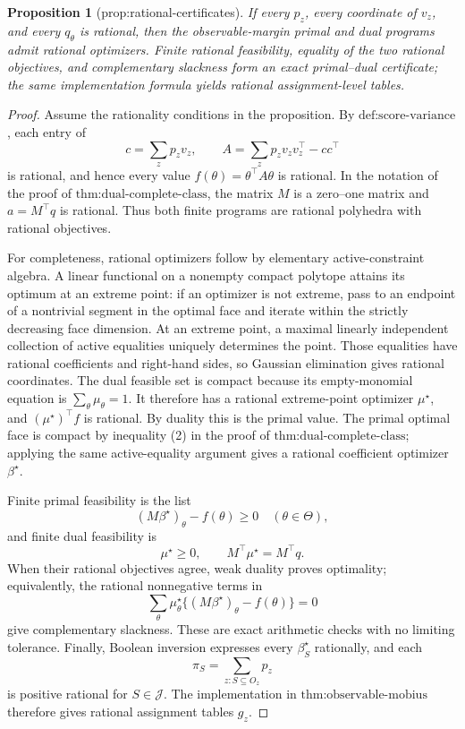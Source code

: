 \documentclass{article}
\newtheorem{proposition}{Proposition}
\begin{document}
\begin{proposition}[prop:rational-certificates]\label{prop:rational-certificates}
If every \(p_z\), every coordinate of \(v_z\), and every \(q_\theta\) is rational, then the observable-margin primal and dual programs admit rational optimizers. Finite rational feasibility, equality of the two rational objectives, and complementary slackness form an exact primal--dual certificate; the same implementation formula yields rational assignment-level tables.
\end{proposition}
\begin{proof}
Assume the rationality conditions in the proposition.  By \(\text{def:score-variance}\), each entry of
\[
 c=\sum_zp_zv_z,\quad\quad
 A=\sum_zp_zv_zv_z^\top-cc^\top
\]
is rational, and hence every value \(f(\theta)=\theta^\top A\theta\) is rational.  In the notation of the proof of \(\text{thm:dual-complete-class}\), the matrix \(M\) is a zero--one matrix and \(a=M^\top q\) is rational.  Thus both finite programs are rational polyhedra with rational objectives.

For completeness, rational optimizers follow by elementary active-constraint algebra.  A linear functional on a nonempty compact polytope attains its optimum at an extreme point: if an optimizer is not extreme, pass to an endpoint of a nontrivial segment in the optimal face and iterate within the strictly decreasing face dimension.  At an extreme point, a maximal linearly independent collection of active equalities uniquely determines the point.  Those equalities have rational coefficients and right-hand sides, so Gaussian elimination gives rational coordinates.  The dual feasible set is compact because its empty-monomial equation is \(\sum_\theta\mu_\theta=1\).  It therefore has a rational extreme-point optimizer \(\mu^\star\), and \((\mu^\star)^\top f\) is rational.  By duality this is the primal value.  The primal optimal face is compact by inequality (2) in the proof of \(\text{thm:dual-complete-class}\); applying the same active-equality argument gives a rational coefficient optimizer \(\beta^\star\).

Finite primal feasibility is the list
\[
 (M\beta^\star)_\theta-f(\theta)\ge0
 \quad(\theta\in\Theta),
\]
and finite dual feasibility is
\[
 \mu^\star\ge0,\quad\quad M^\top\mu^\star=M^\top q.
\]
When their rational objectives agree, weak duality proves optimality; equivalently, the rational nonnegative terms in
\[
 \sum_\theta\mu^\star_\theta
       \{(M\beta^\star)_\theta-f(\theta)\}=0
\]
give complementary slackness.  These are exact arithmetic checks with no limiting tolerance.  Finally, Boolean inversion expresses every \(\beta_S^\star\) rationally, and each
\[
 \pi_S=\sum_{z:S\subseteq O_z}p_z
\]
is positive rational for \(S\in\mathcal J\).  The implementation in \(\text{thm:observable-mobius}\) therefore gives rational assignment tables \(g_z\).
\end{proof}
\end{document}
